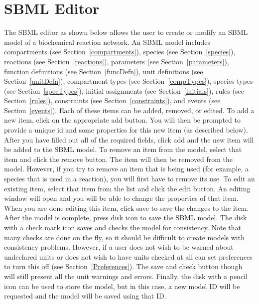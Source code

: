 \documentclass[titlepage,11pt]{article}
\begin{document}
\clearpage

\section{\label{SBMLEdit}SBML Editor}

\noindent
The SBML editor as shown below allows the user to create or modify an SBML
model of a biochemical reaction network.  An SBML model includes
compartments (see Section~\ref{compartments}), 
species (see Section~\ref{species}),
reactions (see Section~\ref{reactions}), 
parameters (see Section~\ref{parameters}),
function definitions (see Section~\ref{funcDefn}), 
unit definitions (see Section~\ref{unitDefn}), 
compartment types (see Section~\ref{compTypes}), 
species types (see Section~\ref{specTypes}),
initial assignments (see Section~\ref{initials}), 
rules (see Section~\ref{rules}), 
constraints (see Section~\ref{constraints}), and
events (see Section~\ref{events}).
Each of these items can be added, removed, or edited. 
To add a new item, click on the appropriate add button. You
will then be prompted to provide a unique id and some properties
for this new item (as described below). After you have filled out
all of the required fields, click add and the new item will be
added to the SBML model.
To remove an item from the model, select that item and click
the remove button. The item will then be removed from the model.
However, if you try to remove an item that is being used 
(for example, a species that is used in a reaction), you will first have 
to remove its use.
To edit an existing item, select that item from the list and
click the edit button. An editing window will open and you will
be able to change the properties of that item. When you are done
editing this item, click save to save the changes to the item. 
After the model is complete, press disk icon to save the SBML model.  
The disk with a check mark icon saves and checks the 
model for consistency.
Note that many checks are done on the fly, so it should be difficult
to create models with consistency problems.  However, if a user does
not wish to be warned about undeclared units or does not wish to have
units checked at all can set preferences to turn this off
(see Section~\ref{Preferences}).  The save and check button
though will still present all the unit warnings and errors.
Finally, the disk with a pencil icon can be used to store the
model, but in this case, a new model ID will be requested and the
model will be saved using that ID. 
\end{document}
